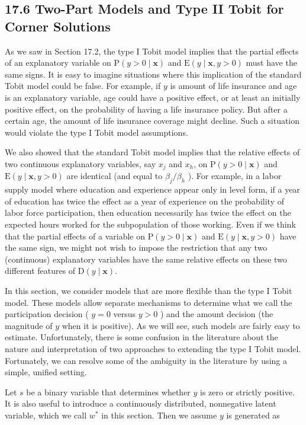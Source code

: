 \documentclass[10pt]{article}
\begin{document}
\subsection*{17.6 Two-Part Models and Type II Tobit for Corner Solutions}
As we saw in Section 17.2, the type I Tobit model implies that the partial effects of an explanatory variable on $\mathrm{P}(y>0 \mid \mathbf{x})$ and $\mathrm{E}(y \mid \mathbf{x}, y>0)$ must have the same signs. It is easy to imagine situations where this implication of the standard Tobit model could be false. For example, if $y$ is amount of life insurance and age is an explanatory variable, age could have a positive effect, or at least an initially positive effect, on the probability of having a life insurance policy. But after a certain age, the amount of life insurance coverage might decline. Such a situation would violate the type I Tobit model assumptions.

We also showed that the standard Tobit model implies that the relative effects of two continuous explanatory variables, say $x_{j}$ and $x_{h}$, on $\mathrm{P}(y>0 \mid \mathbf{x})$ and $\mathrm{E}(y \mid \mathbf{x}, y>0)$ are identical (and equal to $\beta_{j} / \beta_{h}$ ). For example, in a labor supply model where education and experience appear only in level form, if a year of education has twice the effect as a year of experience on the probability of labor force participation, then education necessarily has twice the effect on the expected hours worked for the subpopulation of those working. Even if we think that the partial effects of a variable on $\mathrm{P}(y>0 \mid \mathbf{x})$ and $\mathrm{E}(y \mid \mathbf{x}, y>0)$ have the same sign, we might not wish to impose the restriction that any two (continuous) explanatory variables have the same relative effects on these two different features of $\mathrm{D}(y \mid \mathbf{x})$.

In this section, we consider models that are more flexible than the type I Tobit model. These models allow separate mechanisms to determine what we call the participation decision ( $y=0$ versus $y>0$ ) and the amount decision (the magnitude of $y$ when it is positive). As we will see, such models are fairly easy to estimate. Unfortunately, there is some confusion in the literature about the nature and interpretation of two approaches to extending the type I Tobit model. Fortunately, we can resolve some of the ambiguity in the literature by using a simple, unified setting.

Let $s$ be a binary variable that determines whether $y$ is zero or strictly positive. It is also useful to introduce a continuously distributed, nonnegative latent variable, which we call $w^{*}$ in this section. Then we assume $y$ is generated as
\end{document}
